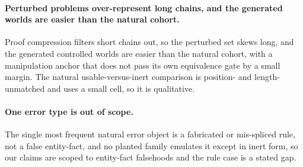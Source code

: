 \paragraph{Perturbed problems over-represent long chains, and the generated
worlds are easier than the natural cohort.} Proof compression filters short
chains out, so the perturbed set skews long, and the generated
controlled worlds are easier than the natural cohort, with a manipulation
anchor that does not pass its own equivalence gate by a small margin. The
natural usable-versus-inert comparison is position- and length-unmatched and
uses a small cell, so it is qualitative.

\paragraph{One error type is out of scope.} The single most frequent natural
error object is a fabricated or mis-spliced rule, not a false entity-fact,
and no planted family emulates it except in inert form, so our claims are
scoped to entity-fact falsehoods and the rule case is a stated gap.
